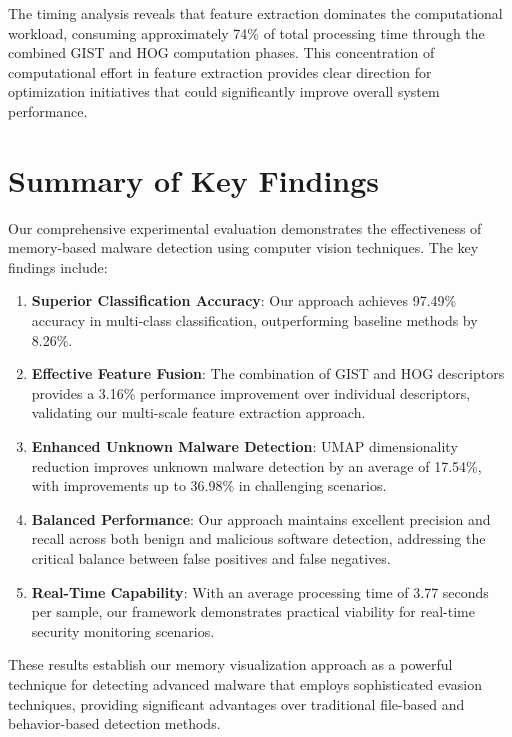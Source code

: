 The timing analysis reveals that feature extraction dominates the computational workload, consuming approximately 74\% of total processing time through the combined GIST and HOG computation phases. This concentration of computational effort in feature extraction provides clear direction for optimization initiatives that could significantly improve overall system performance.

\section{Summary of Key Findings}
\label{sec:key-findings}

Our comprehensive experimental evaluation demonstrates the effectiveness of memory-based malware detection using computer vision techniques. The key findings include:

\begin{enumerate}
    \item \textbf{Superior Classification Accuracy}: Our approach achieves 97.49\% accuracy in multi-class classification, outperforming baseline methods by 8.26\%.

    \item \textbf{Effective Feature Fusion}: The combination of GIST and HOG descriptors provides a 3.16\% performance improvement over individual descriptors, validating our multi-scale feature extraction approach.

    \item \textbf{Enhanced Unknown Malware Detection}: UMAP dimensionality reduction improves unknown malware detection by an average of 17.54\%, with improvements up to 36.98\% in challenging scenarios.

    \item \textbf{Balanced Performance}: Our approach maintains excellent precision and recall across both benign and malicious software detection, addressing the critical balance between false positives and false negatives.

    \item \textbf{Real-Time Capability}: With an average processing time of 3.77 seconds per sample, our framework demonstrates practical viability for real-time security monitoring scenarios.
\end{enumerate}

These results establish our memory visualization approach as a powerful technique for detecting advanced malware that employs sophisticated evasion techniques, providing significant advantages over traditional file-based and behavior-based detection methods.
